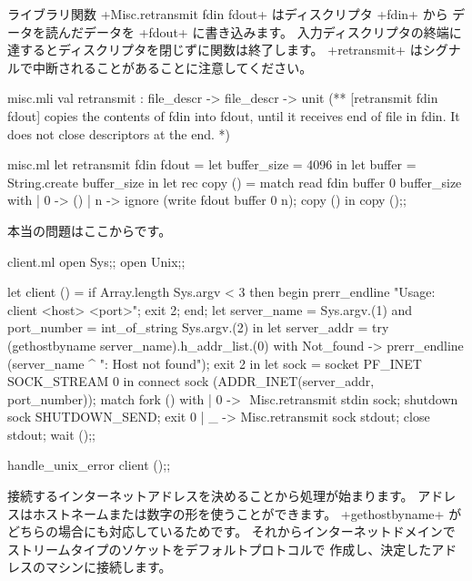 ライブラリ関数 \ml+Misc.retransmit fdin fdout+ はディスクリプタ \ml+fdin+ から
データを読んだデータを \ml+fdout+ に書き込みます。
入力ディスクリプタの終端に達するとディスクリプタを閉じずに関数は終了します。
\ml+retransmit+ はシグナルで中断されることがあることに注意してください。
\begin{codefile}{misc.mli}
val retransmit : file_descr -> file_descr -> unit
(** [retransmit fdin fdout] copies the contents of fdin into fdout, until
it receives end of file in fdin. It does not close descriptors at the
end. *)
\end{codefile}
\begin{listingcodefile}{misc.ml}
let retransmit fdin fdout =
  let buffer_size = 4096 in
  let buffer = String.create buffer_size in
  let rec copy () = match read fdin buffer 0 buffer_size with
    | 0 -> ()
    | n -> ignore (write fdout buffer 0 n); copy ()
  in
  copy ();;
\end{listingcodefile}
本当の問題はここからです。
\begin{listingcodefile}[style=numbers]{client.ml}
open Sys;;
open Unix;;

let client () =
  if Array.length Sys.argv < 3 then begin
    prerr_endline "Usage: client <host> <port>";
    exit 2;
  end;
  let server_name = Sys.argv.(1)
  and port_number = int_of_string Sys.argv.(2) in
  let server_addr =
    try (gethostbyname server_name).h_addr_list.(0)
    with Not_found ->
      prerr_endline (server_name ^ ": Host not found");
      exit 2 in
  let sock = socket PF_INET SOCK_STREAM 0 in
  connect sock (ADDR_INET(server_addr, port_number));
  match fork () with
  | 0 -> $\label{prog:add_signal_ignore}$
      Misc.retransmit stdin sock;
      shutdown sock SHUTDOWN_SEND;
      exit 0
  | _ ->
      Misc.retransmit sock stdout;
      close stdout;
      wait ();;

handle_unix_error client ();;
\end{listingcodefile}

接続するインターネットアドレスを決めることから処理が始まります。
アドレスはホストネームまたは数字の形を使うことができます。
\ml+gethostbyname+ がどちらの場合にも対応しているためです。
それからインターネットドメインでストリームタイプのソケットをデフォルトプロトコルで
作成し、決定したアドレスのマシンに接続します。

